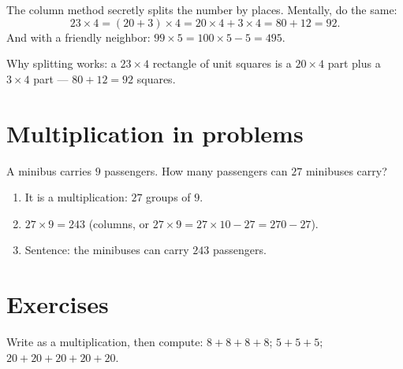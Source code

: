 \begin{example}\label{ex:g3:mult:split}
The column method secretly splits the number by places. Mentally, do
the same:
\[
23 \times 4 = (20 + 3) \times 4 = 20 \times 4 + 3 \times 4
= 80 + 12 = 92 .
\]
And with a friendly neighbor: $99 \times 5 = 100 \times 5 - 5 =
495$.
\end{example}

\begin{omfigure}

{\small Why splitting works: a $23 \times 4$ rectangle of unit
squares is a $20 \times 4$ part plus a $3 \times 4$ part ---
$80 + 12 = 92$ squares.}
\end{omfigure}

\section{Multiplication in problems}

\begin{example}\label{ex:g3:mult:problem}
A minibus carries $9$ passengers. How many passengers can $27$
minibuses carry?
\begin{enumerate}
  \item It is a multiplication: $27$ groups of $9$.
  \item $27 \times 9 = 243$ (columns, or
        $27 \times 9 = 27 \times 10 - 27 = 270 - 27$).
  \item Sentence: the minibuses can carry $243$ passengers.
\end{enumerate}
\end{example}

\section{Exercises}

\begin{exercise}[$\star$]\label{exo:g3:mult:1}
Write as a multiplication, then compute:
$8 + 8 + 8 + 8$; \quad $5 + 5 + 5$; \quad
$20 + 20 + 20 + 20 + 20$.
\end{exercise}

